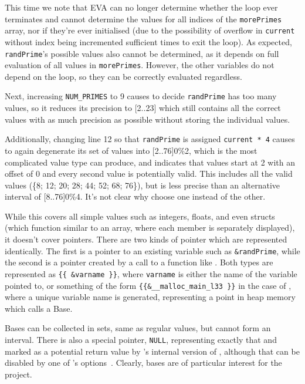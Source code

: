 This time we note that EVA can no longer determine whether the loop ever terminates and cannot determine the values for all indices of the \texttt{morePrimes} array, nor if they're ever initialised (due to the possibility of overflow in \texttt{current} without index being incremented sufficient times to exit the loop). As expected, \texttt{randPrime}'s possible values also cannot be determined, as it depends on full evaluation of all values in \texttt{morePrimes}. However, the other variables do not depend on the loop, so they can be correctly evaluated regardless.

Next, increasing \texttt{NUM\_PRIMES} to 9 causes  to decide \texttt{randPrime} has too many values, so it reduces its precision to [2..23] which still contains all the correct values with as much precision as possible without storing the individual values.

Additionally, changing line 12 so that \texttt{randPrime} is assigned \texttt{current * 4} causes  to again degenerate its set of values into [2..76]0\%2, which is the most complicated value type  can produce, and indicates that values start at 2 with an offset of 0 and every second value is potentially valid. This includes all the valid values (\{8; 12; 20; 28; 44; 52; 68; 76\}), but is less precise than an alternative interval of [8..76]0\%4. It's not clear why  choose one instead of the other.

While this covers all simple values such as integers, floats, and even structs (which function similar to an array, where each member is separately displayed), it doesn't cover pointers. There are two kinds of pointer which are represented identically. The first is a pointer to an existing variable such as \texttt{\&randPrime}, while the second is a pointer created by a call to a function like \malloc{}. Both types are represented as \texttt{\{\{ \&varname \}\}}, where \texttt{varname} is either the name of the variable pointed to, or something of the form \texttt{\{\{\&\_\_malloc\_main\_l33 \}\}} in the case of \malloc{}, where a unique variable name is generated, representing a point in heap memory which  calls a Base.

Bases can be collected in sets, same as regular values, but cannot form an interval. There is also a special pointer, \texttt{NULL}, representing exactly that and marked as a potential return value by 's internal version of \malloc{}, although that can be disabled by one of 's options~\cite{framamalloc}. Clearly, bases are of particular interest for the project.

